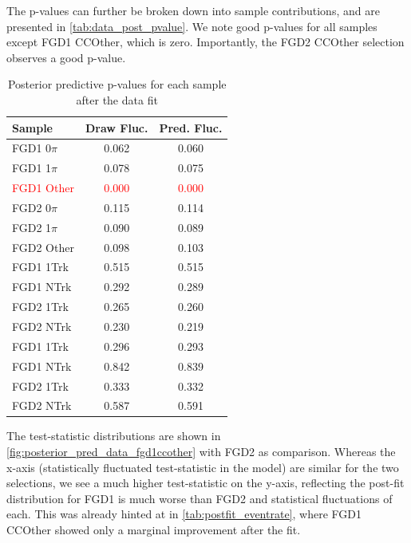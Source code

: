 The p-values can further be broken down into sample contributions, and are presented in \autoref{tab:data_post_pvalue}. We note good p-values for all samples except FGD1 CCOther, which is zero. Importantly, the FGD2 CCOther selection observes a good p-value.
\begin{table}[h]
	\centering
\begin{tabular}{l | c c }
	\hline \hline
	Sample & Draw Fluc. & Pred. Fluc. \\
	\hline
	FGD1 0$\pi$ & 0.062 & 0.060 \\
	FGD1 1$\pi$ & 0.078 & 0.075 \\
	\textcolor{red}{FGD1 Other}  & \textcolor{red}{0.000} & \textcolor{red}{0.000} \\
	FGD2 0$\pi$ & 0.115 & 0.114 \\
	FGD2 1$\pi$ & 0.090 & 0.089 \\
	FGD2 Other  & 0.098 & 0.103 \\
	\hline
	FGD1 1Trk & 0.515 & 0.515 \\
	FGD1 NTrk & 0.292 & 0.289 \\
	FGD2 1Trk & 0.265 & 0.260 \\
	FGD2 NTrk & 0.230 & 0.219 \\
	\hline
	FGD1 \numu 1Trk & 0.296 & 0.293 \\
	FGD1 \numu NTrk & 0.842 & 0.839 \\
	FGD2 \numu 1Trk & 0.333 & 0.332 \\
	FGD2 \numu NTrk & 0.587 & 0.591 \\
	\hline
	\hline
\end{tabular}
\caption{Posterior predictive p-values for each sample after the data fit}
\label{tab:data_post_pvalue}
\end{table}

The test-statistic distributions are shown in \autoref{fig:posterior_pred_data_fgd1ccother} with FGD2 as comparison. Whereas the x-axis (statistically fluctuated test-statistic in the model) are similar for the two selections, we see a much higher test-statistic on the y-axis, reflecting the post-fit distribution for FGD1 is much worse than FGD2 and statistical fluctuations of each. This was already hinted at in \autoref{tab:postfit_eventrate}, where FGD1 CCOther showed only a marginal improvement after the fit.


